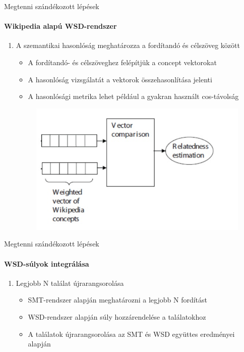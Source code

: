 \begin{frame}{Megtenni szándékozott lépések}
\framesubtitle{Wikipedia alapú WSD-rendszer}

	\begin{enumerate}
		\restorecounter	
	
		\item A szemantikai hasonlóság meghatározza a fordítandó és célszöveg között
		\begin{itemize}
			\item A fordítandó- és célszöveghez felépítjük a concept vektorokat
			\item A hasonlóság vizsgálatát a vektorok összehasonlítása jelenti
			\item A hasonlósági metrika lehet például a gyakran használt cos-távolság
		\end{itemize}
	
		\begin{figure}[t]
			\includegraphics[scale=0.4]{images/similarity}
 		\end{figure}	
	
		\savecounter
	\end{enumerate}

\end{frame}

\begin{frame}{Megtenni szándékozott lépések}
\framesubtitle{WSD-súlyok integrálása}	
	
	\begin{enumerate}
		\restorecounter
						
		\item Legjobb N találat újrarangsorolása
		\begin{itemize}
			\item SMT-rendszer alapján meghatározni a legjobb N fordítást
			\item WSD-rendszer alapján súly hozzárendelése a találatokhoz
			\item A találatok újrarangsorolása az SMT és WSD együttes eredményei alapján
		\end{itemize}
	\end{enumerate}
	
\end{frame}